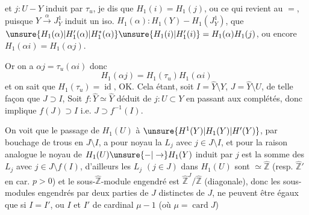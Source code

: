 et $j:U-Y$ induit par $\tau_u$, je dis que $H_1(i)=H_1(j)$, ou ce qui revient au $=$, puisque $Y\xrightarrow{\alpha}J_Y^1$ induit un iso. $H_1(\alpha):H_1(Y)-H_1(J_Y^1)$, que $\unsure{H_1(\alpha)|H'_1(\alpha)|H_1^*(\alpha)}\unsure{H_1(i)|H'_1(i)}=H_1(\alpha)H_1(j)$, ou encore $H_1(\alpha i)=H_1(\alpha j)$.

Or on a $\alpha j=\tau_u(\alpha i)$ donc 
\[
H_1(\alpha j)=H_1(\tau_u)H_1(\alpha i)
\]
et on sait que $H_1(\tau_u)=\operatorname{id}$, OK. Cela étant, soit $I=\widehat Y\setminus Y$, $J=\widehat Y\setminus U$, de telle façon que $J\supset I$,  Soit $f:\widehat Y\simeq\widehat Y$ déduit de $j:U\subset Y$ en passant aux complétés, donc   implique $f(J)\supset I$ i.e. $J\supset f^{-1}(I)$.

On voit que le passage de $H_1(U)$ à $\unsure{H^1(Y)|H_1(Y)|H'(Y)}$, par bouchage de trous en $J\setminus I$, a pour noyau la  $L_j$ avec $j\in J\setminus I$, et pour la raison analogue le noyau de $H_1(U)\unsure{-|\to}H_1(Y)$ induit par $j$ est la somme des $L_j$ avec $j\in J\setminus f(I)$, d'ailleurs les $L_j$ $(j\in J)$ dans $H_1(U)$ sont $\simeq\widehat{\mathbb Z}$ (resp. $\widehat{\mathbb Z}'$ en car. $p>0$) et le sous-$\widehat{\mathbb Z}$-module engendré est $\widehat{\mathbb Z}^{J}/\widehat{\mathbb Z}$ (diagonale), donc  les sous-modules engendrés par deux parties  de $J$ distinctes de $J$, ne peuvent être égaux que si $I=I'$, ou $I$ et $I'$ de cardinal $\mu-1$ (où $\mu=\operatorname{card}J$)

